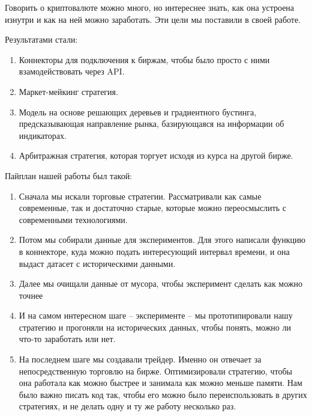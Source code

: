 Говорить о криптовалюте можно много, но интереснее знать, как она устроена изнутри и как на ней можно заработать. Эти цели мы поставили в своей работе.


Результатами стали:

\begin{enumerate}

\item Коннекторы для подключения к биржам, чтобы было просто с ними взамодействовать через API.

\item Маркет-мейкинг стратегия.

\item Модель на основе решающих деревьев и градиентного бустинга, предсказывающая направление рынка, базирующаяся на информации об индикаторах.

\item Арбитражная стратегия, которая торгует исходя из курса на другой бирже.

\end{enumerate}


Пайплан нашей работы был такой:

\begin{enumerate}
\item Сначала мы искали торговые стратегии. Рассматривали как самые современные, так и достаточно старые, которые можно переосмыслить с современными технологиями.
\item Потом мы собирали данные для экспериментов. Для этого написали функцию в коннекторе, куда можно подать интересующий интервал времени, и она выдаст датасет с историческими данными.
\item Далее мы очищали данные от мусора, чтобы эксперимент сделать как можно точнее
\item И на самом интересном шаге -- эксперименте -- мы прототипировали нашу стратегию и прогоняли на исторических данных, чтобы понять, можно ли что-то заработать или нет.
\item На последнем шаге мы создавали трейдер. Именно он отвечает за непосредственную торговлю на бирже. Оптимизировали стратегию, чтобы она работала как можно быстрее и занимала как можно меньше памяти. Нам было важно писать код так, чтобы его можно было переиспользовать в других стратегиях, и не делать одну и ту же работу несколько раз.
\end{enumerate}

